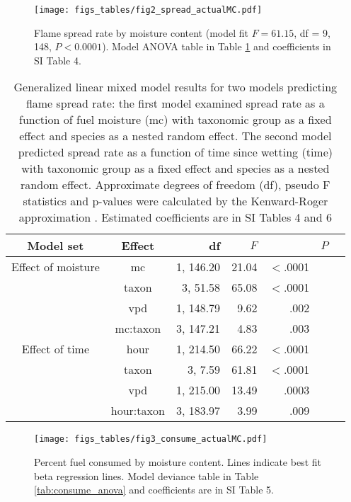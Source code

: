 \documentclass[letterpaper,12pt]{article}
\begin{document}
\begin{figure}[h]
  \centering
\texttt{[image: figs\_tables/fig2\_spread\_actualMC.pdf]}
\caption{Flame spread rate by moisture content (model fit $F = 61.15$, df = 9,
  148, $P < 0.0001$). Model ANOVA table in Table \ref{tab:spreadrate_anova} and
  coefficients in SI Table 4.}
  \label{fig:spread_moist}
\end{figure}

\begin{table}[h]
  \caption{Generalized linear mixed model results for two models predicting
    flame spread rate: the first model examined spread rate as a function of
    fuel moisture (mc) with taxonomic group as a fixed effect and species as a
    nested random effect. The second model predicted spread rate as a function
    of time since wetting (time) with taxonomic group as a fixed effect and
    species as a nested random effect. Approximate degrees of freedom (df),
    pseudo F statistics and p-values were calculated by the Kenward-Roger
    approximation \citep{Kenward_Roger-1997}. Estimated coefficients are in SI
    Tables 4 and 6}
  \label{tab:spreadrate_anova}
  
\centering
\begin{tabular}{ccrrrrr}
  \toprule
Model set & Effect & df & $F$ & & $P$ \\
  \midrule
  Effect of moisture & mc & 1, 146.20 & 21.04 & $<$.0001 \\ 
 & taxon & 3, 51.58 & 65.08 & $<$.0001 \\ 
 & vpd & 1, 148.79 & 9.62 & .002 \\ 
 & mc:taxon & 3, 147.21 & 4.83 & .003 \\ 
   
  \midrule
  
  Effect of time & hour & 1, 214.50 & 66.22 & $<$.0001 \\ 
 &  taxon & 3, 7.59 & 61.81 & $<$.0001 \\ 
 & vpd & 1, 215.00 & 13.49 & .0003 \\ 
 & hour:taxon & 3, 183.97 & 3.99 & .009 \\ 

   \bottomrule

\end{tabular}
\end{table}

\begin{figure}[h]
  \centering
\texttt{[image: figs\_tables/fig3\_consume\_actualMC.pdf]}
\caption{Percent fuel consumed by moisture content. Lines indicate best fit
  beta regression lines. Model deviance table in Table \ref{tab:consume_anova}
  and coefficients are in SI Table 5.}
  \label{fig:consume_moist}
\end{figure}
\end{document}
